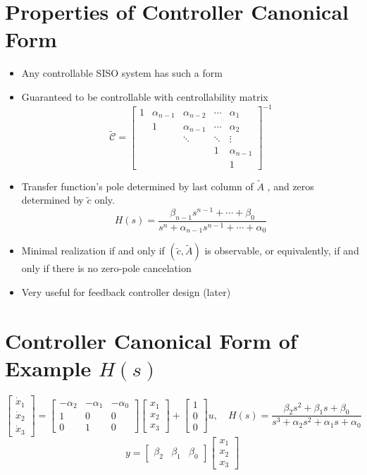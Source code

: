 \documentclass[10pt,a4paper,oneside]{article}
\begin{document}
\section{Properties of Controller Canonical Form}
\begin{itemize}
\item Any controllable SISO system has such a form
\item Guaranteed to be controllable with centrollability matrix
\[
\tilde{\mathcal{C}}=\left[\begin{array}{ccccc}{1} & {\alpha_{n-1}} & {\alpha_{n-2}} & {\cdots} & {\alpha_{1}} \\ {} & {1} & {\alpha_{n-1}} & {\cdots} & {\alpha_{2}} \\{}&{} {} & {\ddots} & {\ddots} & {\vdots} \\ {}&{} & {} & {1} & {\alpha_{n-1}} \\ {}&{} & {} & {} & {1}\end{array}\right]^{-1}
\]
\item Transfer function's pole determined by last column of $\tilde{A}$ , and zeros
determined by $\tilde{c}$ only.
\[
H(s)=\frac{\beta_{n-1} s^{n-1}+\cdots+\beta_{0}}{s^{n}+\alpha_{n-1} s^{n-1}+\cdots+\alpha_{0}}
\]
\item Minimal realization if and only if $(\tilde{c}, \tilde{A})$ is observable, or equivalently, if and only if there is no zero-pole cancelation
\item Very useful for feedback controller design (later)
\end{itemize}
\section{Controller Canonical Form of Example $H(s)$}
\[
\left[\begin{array}{c}{\dot{x}_{1}} \\ {\dot{x}_{2}} \\ {\dot{x}_{3}}\end{array}\right]=\left[\begin{array}{ccc}{-\alpha_{2}} & {-\alpha_{1}} & {-\alpha_{0}} \\ {1} & {0} & {0} \\ {0} & {1} & {0}\end{array}\right]\left[\begin{array}{c}{x_{1}} \\ {x_{2}} \\ {x_{3}}\end{array}\right]+\left[\begin{array}{c}{1} \\ {0} \\ {0}\end{array}\right] u, \quad H(s)=\frac{\beta_{2} s^{2}+\beta_{1} s+\beta_{0}}{s^{3}+\alpha_{2} s^{2}+\alpha_{1} s+\alpha_{0}}
\]
\[
y=\left[\begin{array}{lll}{\beta_{2}} & {\beta_{1}} & {\beta_{0}}\end{array}\right]\left[\begin{array}{l}{x_{1}} \\ {x_{2}} \\ {x_{3}}\end{array}\right]
\]
\end{document}
